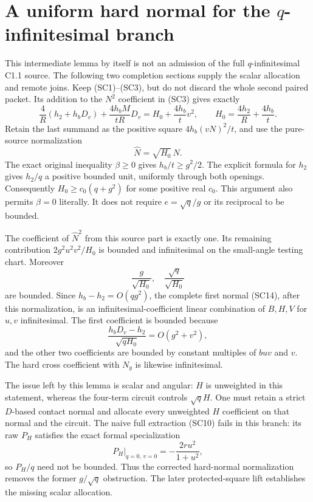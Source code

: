 \section[A uniform hard normal for the q-infinitesimal branch]{A uniform hard normal for the $q$-infinitesimal branch}
This intermediate lemma by itself is not an admission of the full
$q$-infinitesimal C1.1 source. The following two completion sections
supply the scalar allocation and remote joins. Keep (SC1)--(SC3), but do
not discard the whole second paired packet. Its addition to the
$N^2$ coefficient in (SC3) gives exactly
\[
 \frac4R(h_2+h_bD_v)+\frac{4h_bM}{tR}D_v
       =H_0+\frac{4h_b}{t}v^2,
 \qquad H_0=\frac{4h_2}{R}+\frac{4h_b}{t}.
\]
Retain the last summand as the positive square
$4h_b(vN)^2/t$, and use the pure-source normalization
\[
                         \widehat N=\sqrt{H_0}\,N.
\]
The exact original inequality $\beta\ge0$ gives
$h_b/t\ge g^2/2$. The explicit formula for $h_2$ gives
$h_2/q$ a positive bounded unit, uniformly through both openings.
Consequently $H_0\ge c_0(q+g^2)$ for some positive real $c_0$.
This argument also permits $\beta=0$ literally. It does not require
$e=\sqrt q/g$ or its reciprocal to be bounded.

The coefficient of $\widehat N^2$ from this source part is exactly
one. Its remaining contribution $2g^2u^2v^2/H_0$ is bounded and
infinitesimal on the small-angle testing chart. Moreover
\[
 \frac{g}{\sqrt{H_0}},\quad
 \frac{\sqrt q}{\sqrt{H_0}}
\]
are bounded. Since $h_b-h_2=O(qg^2)$, the complete first normal
(SC14), after this normalization, is an infinitesimal-coefficient
linear combination of $B,H,V$ for $u,v$ infinitesimal. The first
coefficient is bounded because
\[
 \frac{h_bD_v-h_2}{\sqrt{qH_0}}
            =O(g^2+v^2),
\]
and the other two coefficients are bounded by constant multiples of
$buv$ and $v$. The hard cross coefficient with $N_y$ is likewise
infinitesimal.

The issue left by this lemma is scalar and angular: $H$ is unweighted in this
statement, whereas the four-term circuit controls $\sqrt q H$.
One must retain a strict $D$-based contact normal and allocate every
unweighted $H$ coefficient on that normal and the circuit. The
naive full extraction (SC10) fails in this branch: its raw $P_H$
satisfies the exact formal specialization
\[
       P_H\big|_{q=0,\,v=0}=-\frac{2ru^2}{1+u^2},
\]
so $P_H/q$ need not be bounded. Thus the corrected hard-normal
normalization removes the former $g/\sqrt q$ obstruction. The later
protected-square lift establishes the missing scalar allocation.
